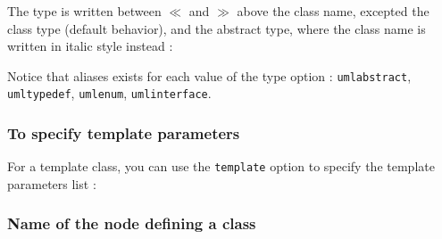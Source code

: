 \documentclass[a4paper,11pt]{report}
\newcommand{\inputTikZ}[1]{%
  }%
\newcommand{\inputTikZ}[1]{%
    \texttt{[image: fig/\#1.pdf]}%
  }%
\begin{document}
\medskip

\begin{minipage}{0.5\textwidth}

\end{minipage}
\begin{minipage}{0.4\textwidth}
\begin{center}
\inputTikZ{classtype}
\end{center}
\end{minipage}

\medskip

The type is written between $\ll$ and $\gg$ above the class name, excepted the class type (default behavior), and the abstract type, where the class name is written in italic style instead :

\medskip

\begin{minipage}{0.5\textwidth}

\end{minipage}
\begin{minipage}{0.4\textwidth}
\begin{center}
\inputTikZ{classabstract}
\end{center}
\end{minipage}

Notice that aliases exists for each value of the type option : {\tt umlabstract}, {\tt umltypedef}, {\tt umlenum}, {\tt umlinterface}.

\subsubsection{To specify template parameters}

For a template class, you can use the {\tt template} option to specify the template parameters list :

\medskip

\begin{minipage}{0.5\textwidth}

\end{minipage}
\begin{minipage}{0.4\textwidth}
\begin{center}
\inputTikZ{classtemplate}
\end{center}
\end{minipage}

\subsubsection{Name of the node defining a class}
\end{document}
